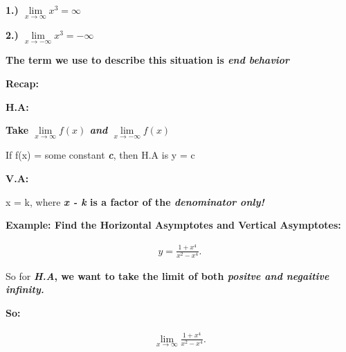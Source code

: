 \documentclass{report}
\begin{document}
        \bigbreak \noindent 
        \textbf{1.) $\lim\limits_{x \to \infty}{x^3} = \infty $}

        \bigbreak \noindent 
        \textbf{2.) $\lim\limits_{x \to - \infty}{x^3} = - \infty$}

        \bigbreak \noindent 
        \textbf{The term we use to describe this situation is \textbf{\textit{end behavior}}}

        \bigbreak \noindent \bigbreak \noindent \bigbreak \noindent 
        \begin{large}
            \textbf{Recap:}
        \end{large}

        \bigbreak \noindent 
        \begin{large}
            \textbf{H.A:}
        \end{large}

        \bigbreak \noindent 
        \textbf{Take $\lim\limits_{x \to \infty}{f(x)}$ \textbf{\textit{and}} $\lim\limits_{x \to - \infty}{f(x)}$}

        \bigbreak \noindent 
        If f(x) = some constant \textbf{\textit{c}}, then H.A is y = c 

        \bigbreak \noindent \bigbreak \noindent 
        \begin{large}
            \textbf{V.A:}
        \end{large}

        \bigbreak \noindent 
        x = k, where \textbf{\textit{x - k} is a factor of the \textbf{\textit{denominator only!}}}

        \bigbreak \noindent \bigbreak \noindent  \bigbreak \noindent 
        \begin{large}
            \textbf{Example: Find the Horizontal Asymptotes and Vertical Asymptotes:}
        \end{large}

        \begin{align*}
            y = \frac{1 + x^4}{x^2 - x^4}
        .\end{align*}

        \bigbreak \noindent 
        So for \textbf{\textit{H.A}, we want to take the limit of both \textbf{\textit{positve and negaitive infinity.}}}

        \bigbreak \noindent 
        \textbf{So:}

        \begin{align*}
            \lim\limits_{x \to \infty}{ \frac{1 + x^4}{x^2 - x^4}}
        .\end{align*}
\end{document}
